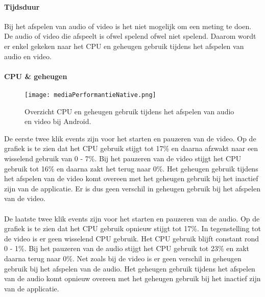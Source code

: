 \paragraph{Tijdsduur}
Bij het afspelen van audio of video is het niet mogelijk om een meting te doen. 
De audio of video die afspeelt is ofwel spelend ofwel niet spelend.
Daarom wordt er enkel gekeken naar het CPU en geheugen gebruik tijdens 
het afspelen van audio en video.

\paragraph{CPU \& geheugen}
\begin{figure}[H]
    \centering
    \texttt{[image: mediaPerformantieNative.png]}
    \caption{Overzicht CPU en geheugen gebruik tijdens het afspelen van audio en video bij Android.}
\end{figure}
De eerste twee klik events zijn voor het starten en pauzeren van de video. Op de grafiek 
is te zien dat het CPU gebruik stijgt tot 17\% en daarna afzwakt naar een wisselend gebruik 
van 0 - 7\%. Bij het pauzeren van de video stijgt het CPU gebruik tot 16\% en daarna
zakt het terug naar 0\%. Het geheugen gebruik tijdens het afspelen van de video komt overeen 
met het geheugen gebruik bij het inactief zijn van de applicatie. Er is dus geen verschil in
geheugen gebruik bij het afspelen van de video.
\\\\
De laatste twee klik events zijn voor het starten en pauzeren van de audio. Op de grafiek
is te zien dat het CPU gebruik opnieuw stijgt tot 17\%. In tegenstelling tot de video is 
er geen wisselend CPU gebruik. Het CPU gebruik blijft constant rond 0 - 1\%. Bij het pauzeren
van de audio stijgt het CPU gebruik tot 23\% en zakt daarna terug naar 0\%. Net zoals bij de 
video is er geen verschil in geheugen gebruik bij het afspelen van de audio. Het geheugen gebruik
tijdens het afspelen van de audio komt opnieuw overeen met het geheugen gebruik bij het inactief zijn van
de applicatie.
